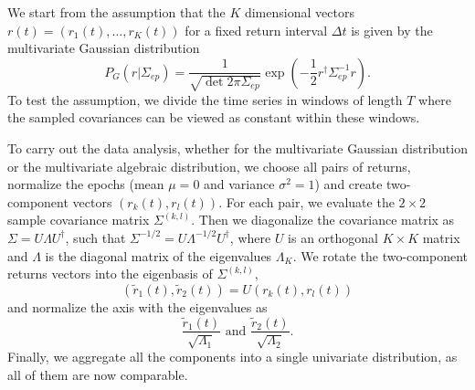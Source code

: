 We start from the assumption that the $K$ dimensional vectors
$r \left( t \right) = \left( r_{1} \left( t \right), \ldots, r_{K} \left( t \right) \right)$
for a fixed return interval $\Delta t$ is given by the multivariate Gaussian
distribution
\begin{equation}\label{eq:gaussian_distribution}
    P_{G} \left( r| \Sigma_{ep} \right) =
    \frac{1}{\sqrt{\det 2 \pi \Sigma_{ep} }}
    \exp \left( - \frac{1}{2} r^{\dagger} \Sigma_{ep}^{-1} r \right).
\end{equation}
To test the assumption, we divide the time series in windows of length $T$
where the sampled covariances can be viewed as constant within these windows.

To carry out the data analysis, whether for the multivariate Gaussian
distribution or the multivariate algebraic distribution, we choose all pairs of
returns, normalize the epochs (mean $\mu = 0$ and variance $\sigma^{2} = 1$)
and create two-component vectors
$\left( r_{k} \left( t \right), r_{l} \left( t \right) \right)$. For each pair,
we evaluate the $2 \times 2$ sample covariance matrix
$\Sigma^{\left(k, l \right)}$. Then we diagonalize the covariance matrix as
$\Sigma = U \Lambda U^{\dagger}$, such that
$\Sigma^{-1/2} = U \Lambda^{-1/2} U^{\dagger}$, where $U$ is an orthogonal
$K \times K$  matrix and $\Lambda$ is the diagonal matrix of the eigenvalues
$\Lambda_{K}$. We rotate the two-component returns vectors into the eigenbasis
of $\Sigma^{\left(k, l \right)}$,
\begin{equation}
    \left(\tilde{r}_{1} \left(t \right), \tilde{r}_{2} \left(t \right) \right)
    = U \left(r_{k} \left(t \right), r_{l} \left(t \right) \right)
\end{equation}
and normalize the axis with the eigenvalues as
\begin{equation}
    \frac{\tilde{r}_{1} \left(t \right)}{\sqrt{\Lambda_{1}}} \text{ and }
    \frac{\tilde{r}_{2} \left(t \right)}{\sqrt{\Lambda_{2}}}.
\end{equation}
Finally, we aggregate all the components into a single univariate distribution,
as all of them are now comparable.

